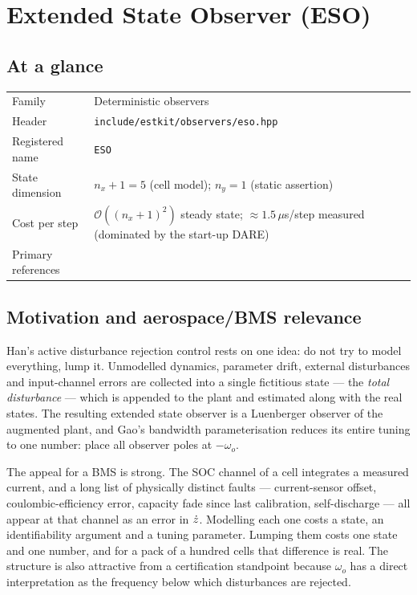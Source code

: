 \chapter{Extended State Observer (ESO)}
\label{ch:eso}

\section*{At a glance}
\begin{tabular}{@{}l>{\raggedright\arraybackslash}p{}@{}}
Family & Deterministic observers \\
Header & \texttt{include/estkit/observers/eso.hpp} \\
Registered name & \texttt{ESO} \\
State dimension & $n_x + 1 = 5$ (cell model); $n_y = 1$ (static assertion) \\
Cost per step & $\mathcal{O}((n_x{+}1)^2)$ steady state; $\approx 1.5\,\mu$s/step measured (dominated by the start-up DARE) \\
Primary references & \cite{han2009adrc,gao2003bandwidth,zheng2007adrcstability,luenberger1971} \\
\end{tabular}

\section{Motivation and aerospace/BMS relevance}
Han's active disturbance rejection control \cite{han2009adrc} rests on one idea: do not try to
model everything, lump it.  Unmodelled dynamics, parameter drift, external disturbances and
input-channel errors are collected into a single fictitious state --- the \emph{total
disturbance} --- which is appended to the plant and estimated along with the real states.  The
resulting extended state observer is a Luenberger observer of the augmented plant, and Gao's
bandwidth parameterisation \cite{gao2003bandwidth} reduces its entire tuning to one number: place
all observer poles at $-\omega_o$.

The appeal for a BMS is strong.  The SOC channel of a cell integrates a measured current, and a
long list of physically distinct faults --- current-sensor offset, coulombic-efficiency error,
capacity fade since last calibration, self-discharge --- all appear at that channel as an error in
$\dot{z}$.  Modelling each one costs a state, an identifiability argument and a tuning
parameter.  Lumping them costs one state and one number, and for a pack of a hundred cells that
difference is real.  The structure is also attractive from a certification standpoint because
$\omega_o$ has a direct interpretation as the frequency below which disturbances are rejected.

